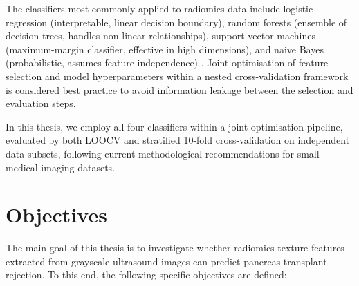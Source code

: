 The classifiers most commonly applied to radiomics data include logistic regression (interpretable, linear decision boundary), random forests (ensemble of decision trees, handles non-linear relationships), support vector machines (maximum-margin classifier, effective in high dimensions), and naive Bayes (probabilistic, assumes feature independence) \cite{parmar2015}. Joint optimisation of feature selection and model hyperparameters within a nested cross-validation framework is considered best practice to avoid information leakage between the selection and evaluation steps.

In this thesis, we employ all four classifiers within a joint optimisation pipeline, evaluated by both LOOCV and stratified 10-fold cross-validation on independent data subsets, following current methodological recommendations for small medical imaging datasets.

\section{Objectives}

The main goal of this thesis is to investigate whether radiomics texture features extracted from grayscale ultrasound images can predict pancreas transplant rejection. To this end, the following specific objectives are defined:

